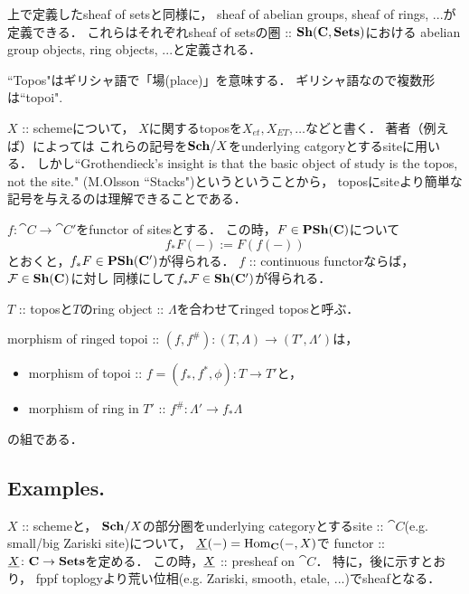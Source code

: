 \documentclass[a4paper, dvipdfmx]{jsarticle}
\begin{document}
\begin{Remark}
    上で定義したsheaf of setsと同様に，
    sheaf of abelian groups, sheaf of rings, ...が定義できる．
    これらはそれぞれsheaf of setsの圏 :: $\mathbf{Sh}(\mathbf{C}, \mathbf{Sets})$における
    abelian group objects, ring objects, ...と定義される．
\end{Remark}

\begin{Remark}
    ``Topos"はギリシャ語で「場(place)」を意味する．
    ギリシャ語なので複数形は``topoi".

    $X$ :: schemeについて，
    $X$に関するtoposを$X_{et}, X_{ET}, \dots$などと書く．
    著者（例えば\cite{SP}）によっては
    これらの記号を$\mathbf{Sch}/X$をunderlying catgoryとするsiteに用いる．
    しかし``Grothendieck’s insight is that the basic object of study is the topos, not the site."
    (M.Olsson ``Stacks")というということから，
    toposにsiteより簡単な記号を与えるのは理解できることである．
\end{Remark}

\begin{Def}
    $f \colon \cat{C} \to \cat{C}'$をfunctor of sitesとする．
    この時，$F \in \mathbf{PSh}(\mathbf{C})$について
    \[ f_*F(-):=F(f(-)) \]
    とおくと，$f_* F \in \mathbf{PSh}(\mathbf{C}')$が得られる．
    $f$ :: continuous functorならば，
    $\mathcal{F} \in \mathbf{Sh}(\mathbf{C})$に対し
    同様にして$f_*\mathcal{F} \in \mathbf{Sh}(\mathbf{C}')$が得られる．
\end{Def}

\begin{Def}
\begin{myenum}
    \item
    $T$ :: toposと$T$のring object :: $\Lambda$を合わせてringed toposと呼ぶ．

    \item
    morphism of ringed topoi :: $(f, f^{\#}) \colon (T, \Lambda) \to (T', \Lambda')$は，
    \begin{itemize}
        \item morphism of topoi :: $f=(f_*, f^*, \phi) \colon T \to T'$と，
        \item morphism of ring in $T'$ :: $f^{\#} \colon \Lambda' \to f_* \Lambda$
    \end{itemize}
    の組である．
\end{myenum}
\end{Def}

\subsection{Examples.}
\begin{Example}
    $X$ :: schemeと，
    $\mathbf{Sch}/X$の部分圏をunderlying categoryとするsite :: $\cat{C}$(e.g. small/big Zariski site)について，
    $\underline{X}(-)=\operatorname{Hom}_{\mathbf{C}}(-, X)$で
    functor :: $\underline{X} \colon \mathbf{C} \to \mathbf{Sets}$を定める．
    この時，$\underline{X}$ :: presheaf on $\cat{C}$．
    特に，後に示すとおり，
    fppf toplogyより荒い位相(e.g. Zariski, smooth, etale, ...)でsheafとなる．
\end{Example}
\end{document}
